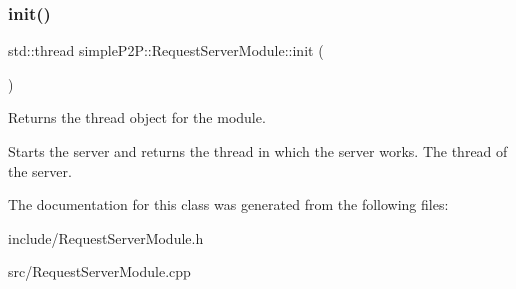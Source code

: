 \subsubsection{\texorpdfstring{init()}{init()}}
{\footnotesize\ttfamily std\+::thread simple\+P2\+P\+::\+Request\+Server\+Module\+::init (\begin{DoxyParamCaption}{ }\end{DoxyParamCaption})}



Returns the thread object for the module. 

Starts the server and returns the thread in which the server works. The thread of the server. 

The documentation for this class was generated from the following files\+:\begin{DoxyCompactItemize}
\item 
include/Request\+Server\+Module.\+h\item 
src/Request\+Server\+Module.\+cpp\end{DoxyCompactItemize}
